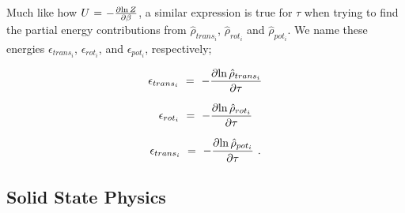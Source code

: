\documentclass{article}
\begin{document}
Much like how \begin{math} U \hspace{0.025cm} = \hspace{0.025cm} - \frac{\partial{\ln{Z}}}{\partial{\beta}} \end{math}, a similar expression is true for \begin{math} \tau \end{math} when trying to find the partial energy contributions from \begin{math} \hat{\rho}_{trans_i} \end{math}, \begin{math} \hat{\rho}_{rot_i} \end{math} and \begin{math} \hat{\rho}_{pot_i} \end{math}. We name these energies \begin{math} \epsilon_{trans_i} \end{math}, \begin{math} \epsilon_{rot_i} \end{math}, and \begin{math} \epsilon_{pot_i} \end{math}, respectively;

\begin{equation} \label{eq:1}
\epsilon_{trans_i} \hspace{0.125cm} = \hspace{0.125cm} - \frac{\partial{\ln{\hat{\rho}_{trans_i}}}}{\partial{\tau}}
\end{equation}

\begin{equation} \label{eq:1}
\epsilon_{rot_i} \hspace{0.125cm} = \hspace{0.125cm} - \frac{\partial{\ln{\hat{\rho}_{rot_i}}}}{\partial{\tau}}
\end{equation}

\begin{equation} \label{eq:1}
\epsilon_{trans_i} \hspace{0.125cm} = \hspace{0.125cm} - \frac{\partial{\ln{\hat{\rho}_{pot_i}}}}{\partial{\tau}}\hspace{0.125cm} .
\end{equation}


\subsection{Solid State Physics}
\end{document}

